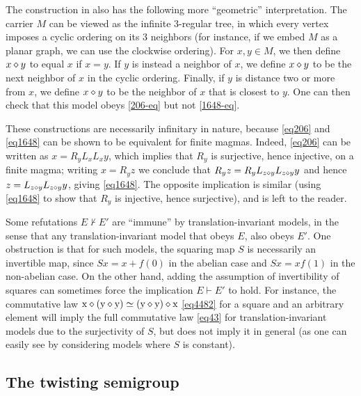 \begin{remark}  The construction in  also has the following more ``geometric'' interpretation.  The carrier $M$ can be viewed as the infinite $3$-regular tree, in which every vertex imposes a cyclic ordering on its $3$ neighbors (for instance, if we embed $M$ as a planar graph, we can use the clockwise ordering).  For $x,y \in M$, we then define $x \diamond y$ to equal $x$ if $x=y$.  If $y$ is instead a neighbor of $x$, we define $x \diamond y$ to be the next neighbor of $x$ in the cyclic ordering.  Finally, if $y$ is distance two or more from $x$, we define $x \diamond y$ to be the neighbor of $x$ that is closest to $y$.  One can then check that this model obeys \eqref{206-eq} but not \eqref{1648-eq}.
\end{remark}

\begin{remark} These constructions are necessarily infinitary in nature, because \eqref{eq206} and \eqref{eq1648} can be shown to be equivalent for finite magmas. Indeed, \eqref{eq206} can be written as $x = R_y L_x L_x y$, which implies that $R_y$ is surjective, hence injective, on a finite magma; writing $x = R_y z$ we conclude that $R_y z = R_y L_{z \diamond y} L_{z \diamond y} y$ and hence $z = L_{z \diamond y} L_{z \diamond y} y$, giving \eqref{eq1648}.  The opposite implication is similar (using \eqref{eq1648} to show that $R_y$ is injective, hence surjective), and is left to the reader.
\end{remark}

  Some refutations $E \nvdash E'$ are ``immune'' by translation-invariant models, in the sense that any translation-invariant model that obeys $E$, also obeys $E'$.  One obstruction is that for such models, the squaring map $S$ is necessarily an invertible map, since $Sx = x + f(0)$ in the abelian case and $Sx = xf(1)$ in the non-abelian case. On the other hand, adding the assumption of invertibility of squares can sometimes force the implication $E \vdash E'$ to hold.  For instance, the commutative law $\mathrm{x} \diamond (\mathrm{y} \diamond \mathrm{y}) \simeq (\mathrm{y} \diamond \mathrm{y}) \diamond \mathrm{x}$ \eqref{eq4482} for a square and an arbitrary element will imply the full commutative law \eqref{eq43} for translation-invariant models due to the surjectivity of $S$, but does not imply it in general (as one can easily see by considering models where $S$ is constant).

\subsection{The twisting semigroup}\label{twisting-sec}

